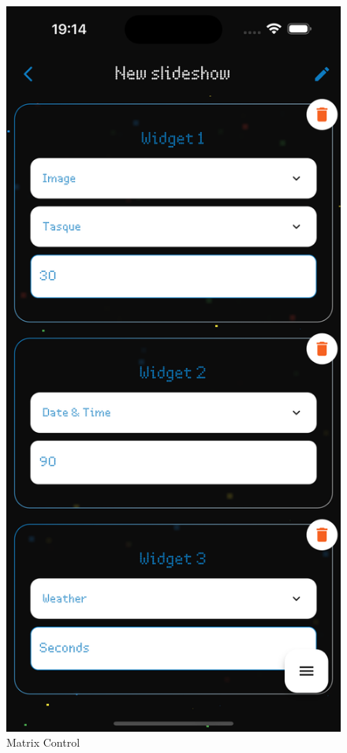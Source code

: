 \begin{figure}[h]
\begin{minipage}[b]{0.24\textwidth}
        \caption*{Matrix Control}
    \end{minipage}
    \begin{minipage}[b]{0.24\textwidth}
        \centering
        \includegraphics[width=\textwidth]{tesi/img/client_demo/slideshows.png}

\end{minipage}
\end{figure}
